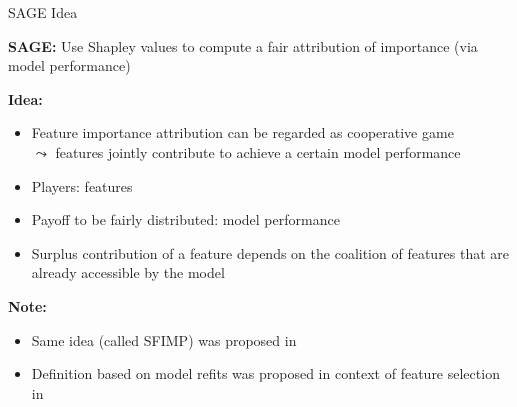 \documentclass[11pt,compress,t,notes=noshow, aspectratio=169, xcolor=table]{beamer}
\begin{document}
\begin{frame}{SAGE Idea 
}

\textbf{SAGE:} %
Use Shapley values to compute a fair attribution of importance (via model performance)\\
\lz

\textbf{Idea:} 
\begin{itemize}
    \item Feature importance attribution can be regarded as cooperative game \\
    $\leadsto$ features jointly contribute to achieve a certain model performance
    \item Players: features
    \item Payoff to be fairly distributed: model performance
    \item Surplus contribution of a feature depends on the coalition of features that are already accessible by the model
\end{itemize}
\lz

\textbf{Note:} 
\begin{itemize}
    \item Same idea (called SFIMP) was proposed in 
    \item Definition based on model refits was proposed in context of feature selection in 
\end{itemize}

\lz

  
\end{frame}
\end{document}
